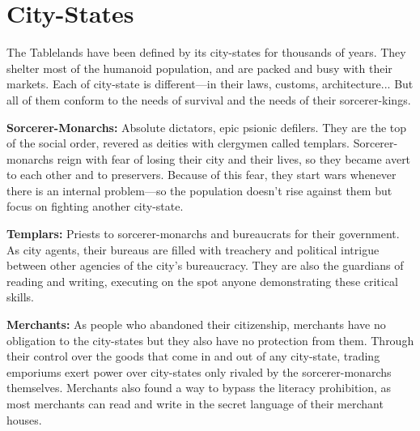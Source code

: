 \section{City-States}
The Tablelands have been defined by its city-states for thousands of years. They shelter most of the humanoid population, and are packed and busy with their markets. Each of city-state is different---in their laws, customs, architecture... But all of them conform to the needs of survival and the needs of their sorcerer-kings.

\textbf{Sorcerer-Monarchs:} Absolute dictators, epic psionic defilers. They are the top of the social order, revered as deities with clergymen called templars. Sorcerer-monarchs reign with fear of losing their city and their lives, so they became avert to each other and to preservers. Because of this fear, they start wars whenever there is an internal problem---so the population doesn't rise against them but focus on fighting another city-state.

\textbf{Templars:} Priests to sorcerer-monarchs and bureaucrats for their government. As city agents, their bureaus are filled with treachery and political intrigue between other agencies of the city's bureaucracy. They are also the guardians of reading and writing, executing on the spot anyone demonstrating these critical skills.

\textbf{Merchants:} As people who abandoned their citizenship, merchants have no obligation to the city-states but they also have no protection from them. Through their control over the goods that come in and out of any city-state, trading emporiums exert power over city-states only rivaled by the sorcerer-monarchs themselves. Merchants also found a way to bypass the literacy prohibition, as most merchants can read and write in the secret language of their merchant houses.








